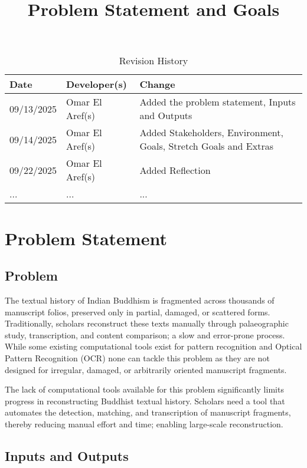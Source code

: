 \documentclass{article}
\title{Problem Statement and Goals\\\progname}
\author{\authname}
\date{}
\begin{document}
\maketitle

\begin{table}[hp]
\caption{Revision History} \label{TblRevisionHistory}
\begin{tabularx}{\textwidth}{llX}
\toprule
\textbf{Date} & \textbf{Developer(s)} & \textbf{Change}\\
\midrule
09/13/2025 & Omar El Aref(s) & Added the problem statement, Inputs and Outputs\\
09/14/2025 & Omar El Aref(s) & Added Stakeholders, Environment, Goals, Stretch Goals and Extras\\
09/22/2025 & Omar El Aref(s) & Added Reflection\\
... & ... & ...\\
\bottomrule
\end{tabularx}
\end{table}

\section{Problem Statement}

\subsection{Problem}
The textual history of Indian Buddhism is fragmented across thousands of manuscript folios, preserved only in partial, damaged, or scattered forms. Traditionally, scholars reconstruct these texts manually through palaeographic study, transcription, and content comparison; a slow and error-prone process. While some existing computational tools exist for pattern recognition and Optical Pattern Recognition (OCR) none can tackle this problem as they are not designed for irregular, damaged, or arbitrarily oriented manuscript fragments. 

The lack of computational tools available for this problem significantly limits progress in reconstructing Buddhist textual history. Scholars need a tool that automates the detection, matching, and transcription of manuscript fragments, thereby reducing manual effort and time; enabling large-scale reconstruction.

\subsection{Inputs and Outputs}
\end{document}
